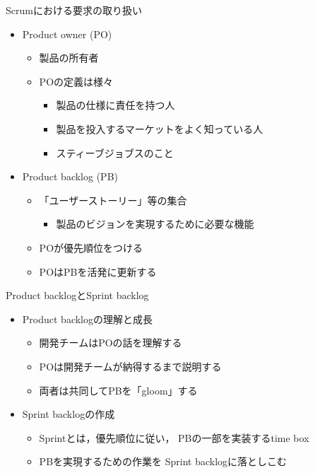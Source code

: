 \documentclass[t]{beamer}
\begin{document}
\begin{frame}[label=sec-4]{Scrumにおける要求の取り扱い}
\begin{itemize}
\item Product owner (PO)
\begin{itemize}
\item 製品の所有者
\item POの定義は様々
\begin{itemize}
\item 製品の仕様に責任を持つ人
\item 製品を投入するマーケットをよく知っている人
\item スティーブジョブスのこと
\end{itemize}
\end{itemize}
\item Product backlog (PB)
\begin{itemize}
\item 「ユーザーストーリー」等の集合
\begin{itemize}
\item 製品のビジョンを実現するために必要な機能
\end{itemize}
\item POが優先順位をつける
\item POはPBを活発に更新する
\end{itemize}
\end{itemize}
\end{frame}

\begin{frame}[label=sec-5]{Product backlogとSprint backlog}
\begin{itemize}
\item Product backlogの理解と成長
\begin{itemize}
\item 開発チームはPOの話を理解する
\item POは開発チームが納得するまで説明する
\item 両者は共同してPBを「gloom」する
\end{itemize}
\item Sprint backlogの作成
\begin{itemize}
\item Sprintとは，優先順位に従い，
PBの一部を実装するtime box
\item PBを実現するための作業を
Sprint backlogに落としこむ
\end{itemize}
\end{itemize}
\end{frame}
\end{document}
